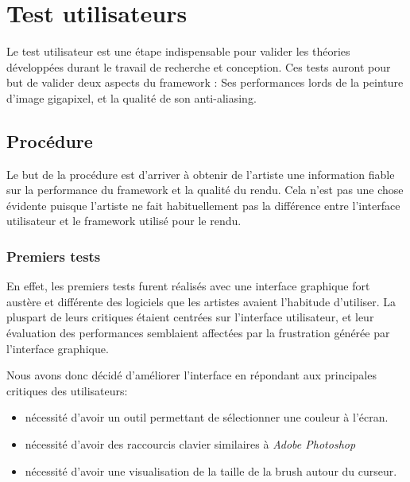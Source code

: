 \chapter{Test utilisateurs}
	Le test utilisateur est une étape indispensable pour valider les
	théories développées durant le travail de recherche et conception.
	Ces tests auront pour but de valider deux aspects du framework : Ses
	performances lords de la peinture d'image gigapixel, et la qualité
	de son anti-aliasing. 

	\section{Procédure}
		Le but de la procédure est d'arriver à obtenir de l'artiste une
		information fiable sur la performance du framework et la qualité du rendu. 
		Cela n'est pas une chose évidente puisque l'artiste ne fait habituellement
		pas la différence entre l'interface utilisateur et le framework utilisé pour
		le rendu. 

		\subsection{Premiers tests}
		En effet, les premiers tests furent réalisés avec une interface graphique fort
		austère et différente des logiciels que les artistes avaient l'habitude d'utiliser.
		La pluspart de leurs critiques étaient centrées sur l'interface utilisateur, et
		leur évaluation des performances semblaient affectées par la frustration générée
		par l'interface graphique.

		Nous avons donc décidé d'améliorer l'interface en répondant aux principales critiques
		des utilisateurs:
		\begin{itemize}
			\item nécessité d'avoir un outil permettant de sélectionner une couleur à l'écran.
			\item nécessité d'avoir des raccourcis clavier similaires à \emph{Adobe Photoshop}
			\item nécessité d'avoir une visualisation de la taille de la brush autour du curseur.
		\end{itemize}

